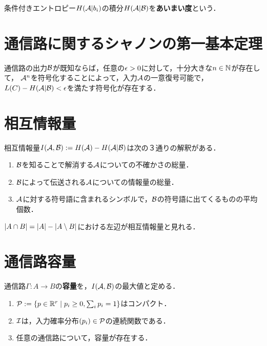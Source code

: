 \documentclass[uplatex,dvipdfmx]{jsreport}
\begin{document}
\begin{discussion}[equivocation]
    条件付きエントロピー$H(\A|b_i)$の積分$H(\A|\B)$を\textbf{あいまい度}という．
\end{discussion}

\section{通信路に関するシャノンの第一基本定理}

\begin{theorem}
    通信路の出力$\B$が既知ならば，任意の$\ep>0$に対して，十分大きな$n\in\N$が存在して，
    $\A^n$を符号化することによって，入力$\A$の一意復号可能で，$L(C)-H(\A|\B)<\ep$を満たす符号化が存在する．
\end{theorem}

\section{相互情報量}

\begin{discussion}
    相互情報量$I(\A,\B):=H(\A)-H(\A|\B)$は次の３通りの解釈がある．
    \begin{enumerate}
        \item $\B$を知ることで解消する$\A$についての不確かさの総量．
        \item $\B$によって伝送される$\A$についての情報量の総量．
        \item $\A$に対する符号語に含まれるシンボルで，$\B$の符号語に出てくるものの平均個数．
    \end{enumerate}
\end{discussion}
\begin{remarks}[数え上げ測度の例]
    $\abs{A\cap B}=\abs{A}-\abs{A\setminus B}$における左辺が相互情報量と見れる．
\end{remarks}

\section{通信路容量}

\begin{definition}[capacity]
    通信路$\Gamma:A\to B$の\textbf{容量}を，$I(\A,\B)$の最大値と定める．
\end{definition}

\begin{theorem}\mbox{}
    \begin{enumerate}
        \item $\P:=\Brace{p\in\R^r\mid p_i\ge 0,\sum_ip_i=1}$はコンパクト．
        \item $\I$は，入力確率分布$(p_i)\in\P$の連続関数である．
        \item 任意の通信路について，容量が存在する．
    \end{enumerate}
\end{theorem}
\end{document}
